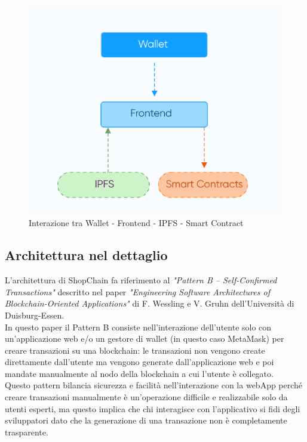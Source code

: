 \begin{figure}[!h] 
    \centering 
    \includegraphics[width=0.9\columnwidth]{immagini/PatternArchitetturale.PNG}
    \caption{Interazione tra Wallet - Frontend - IPFS - Smart Contract \cite{site:dapp-architecture}}
\end{figure}

\subsection{Architettura nel dettaglio}
L'architettura di ShopChain fa riferimento al \textit{"Pattern B – Self-Confirmed Transactions"} descritto nel paper \textit{"Engineering Software Architectures of Blockchain-Oriented Applications"} di F. Wessling e V. Gruhn dell'Università di Duisburg-Essen.\cite{site:paper-architectures-blockchain-oriented-applications} \\
In questo paper il Pattern B consiste nell'interazione dell'utente solo con un'applicazione web e/o un gestore di wallet (in questo caso MetaMask) per creare transazioni su una blockchain: le transazioni non vengono create direttamente dall'utente ma vengono generate dall'applicazione web e poi mandate manualmente al nodo della blockchain a cui l'utente è collegato.\\
Questo pattern bilancia sicurezza e facilità nell'interazione con la webApp perché creare transazioni manualmente è un'operazione difficile e realizzabile solo da utenti esperti, ma questo implica che chi interagisce con l'applicativo si fidi degli sviluppatori dato che la generazione di una transazione non è completamente trasparente.

